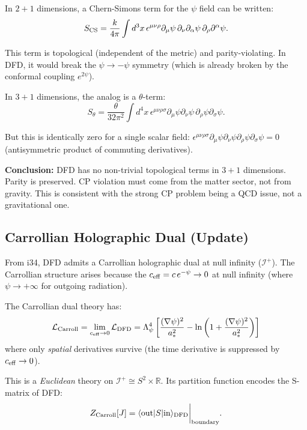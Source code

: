 \documentclass[11pt,a4paper]{article}
\begin{document}
In $2+1$ dimensions, a Chern-Simons term for the $\psi$ field can be written:
\begin{equation}
S_{\rm CS} = \frac{k}{4\pi}\int d^3x\,\epsilon^{\mu\nu\rho}\partial_\mu\psi\,\partial_\nu\partial_\alpha\psi\,\partial_\rho\partial^\alpha\psi.
\end{equation}

This term is topological (independent of the metric) and parity-violating. In DFD, it would break the $\psi \to -\psi$ symmetry (which is already broken by the conformal coupling $e^{2\psi}$).

In $3+1$ dimensions, the analog is a $\theta$-term:
\begin{equation}
S_\theta = \frac{\theta}{32\pi^2}\int d^4x\,\epsilon^{\mu\nu\rho\sigma}\partial_\mu\psi\partial_\nu\psi\,\partial_\rho\psi\partial_\sigma\psi.
\end{equation}

But this is identically zero for a single scalar field: $\epsilon^{\mu\nu\rho\sigma}\partial_\mu\psi\partial_\nu\psi\partial_\rho\psi\partial_\sigma\psi = 0$ (antisymmetric product of commuting derivatives).

\textbf{Conclusion:} DFD has no non-trivial topological terms in $3+1$ dimensions. Parity is preserved. CP violation must come from the matter sector, not from gravity. This is consistent with the strong CP problem being a QCD issue, not a gravitational one.

\subsection{Carrollian Holographic Dual (Update)}

From i34, DFD admits a Carrollian holographic dual at null infinity ($\mathscr{I}^+$). The Carrollian structure arises because the $c_{\rm eff} = c\,e^{-\psi} \to 0$ at null infinity (where $\psi \to +\infty$ for outgoing radiation).

The Carrollian dual theory has:
\begin{equation}
\mathcal{L}_{\rm Carroll} = \lim_{c_{\rm eff}\to 0}\mathcal{L}_{\rm DFD} = \Lambda_\psi^4\left[\frac{(\nabla\psi)^2}{a_*^2} - \ln\left(1 + \frac{(\nabla\psi)^2}{a_*^2}\right)\right]
\end{equation}
where only \emph{spatial} derivatives survive (the time derivative is suppressed by $c_{\rm eff} \to 0$).

This is a \emph{Euclidean} theory on $\mathscr{I}^+ \cong S^2 \times \mathbb{R}$. Its partition function encodes the S-matrix of DFD:
\begin{equation}
Z_{\rm Carroll}[J] = \langle\text{out}|S|\text{in}\rangle_{\rm DFD}\bigg|_{\rm boundary}.
\end{equation}
\end{document}
